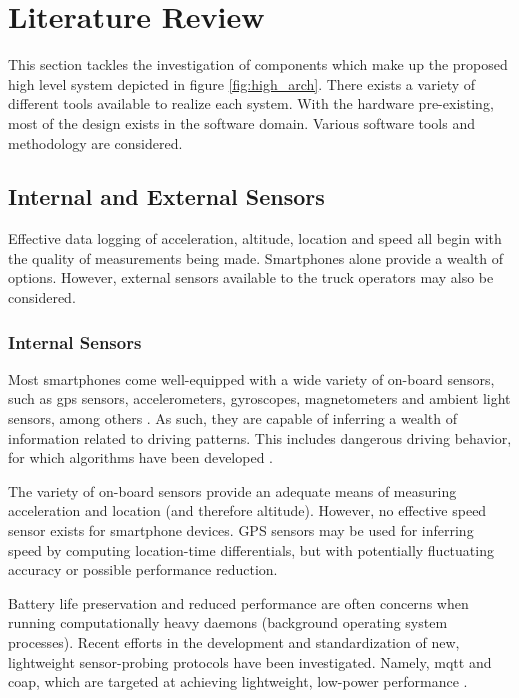 \section{Literature Review}
This section tackles the investigation of components which make up the proposed high level system depicted in figure \ref{fig:high_arch}.
There exists a variety of different tools available to realize each system.
With the hardware pre-existing, most of the design exists in the software domain.
Various software tools and methodology are considered.

\subsection{Internal and External Sensors}
Effective data logging of acceleration, altitude, location and speed all begin with the quality of measurements being made.
Smartphones alone provide a wealth of options.
However, external sensors available to the truck operators may also be considered.

\subsubsection{Internal Sensors}
Most smartphones come well-equipped with a wide variety of on-board sensors, such as \ac{gps} sensors, accelerometers, gyroscopes, magnetometers and ambient light sensors, among others \cite{majumder2019smartphone}.
As such, they are capable of inferring a wealth of information related to driving patterns.
This includes dangerous driving behavior, for which algorithms have been developed \cite{li2016dangerous}.

The variety of on-board sensors provide an adequate means of measuring acceleration and location (and therefore altitude). However, no effective speed sensor exists for smartphone devices.
GPS sensors may be used for inferring speed by computing location-time differentials, but with potentially fluctuating accuracy or possible performance reduction.

Battery life preservation and reduced performance are often concerns when running computationally heavy daemons (background operating system processes).
Recent efforts in the development and standardization of new, lightweight sensor-probing protocols have been investigated.
Namely, \ac{mqtt} and \ac{coap}, which are targeted at achieving lightweight, low-power performance \cite{de2013comparison}.

